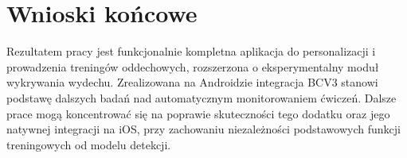 \section{Wnioski końcowe}

Rezultatem pracy jest funkcjonalnie kompletna aplikacja do personalizacji i prowadzenia treningów oddechowych, rozszerzona o eksperymentalny moduł wykrywania wydechu. Zrealizowana na Androidzie integracja BCV3 stanowi podstawę dalszych badań nad automatycznym monitorowaniem ćwiczeń. Dalsze prace mogą koncentrować się na poprawie skuteczności tego dodatku oraz jego natywnej integracji na iOS, przy zachowaniu niezależności podstawowych funkcji treningowych od modelu detekcji.